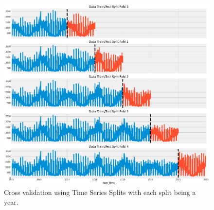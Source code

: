 \begin{figure}[h]
    \centering
    \includegraphics[width=15cm]{report/images/ts-cross-validation.png}
    \caption{Cross validation using Time Series Splits with each split being a year.}
    \label{fig:ts-cross-validation}
\end{figure}